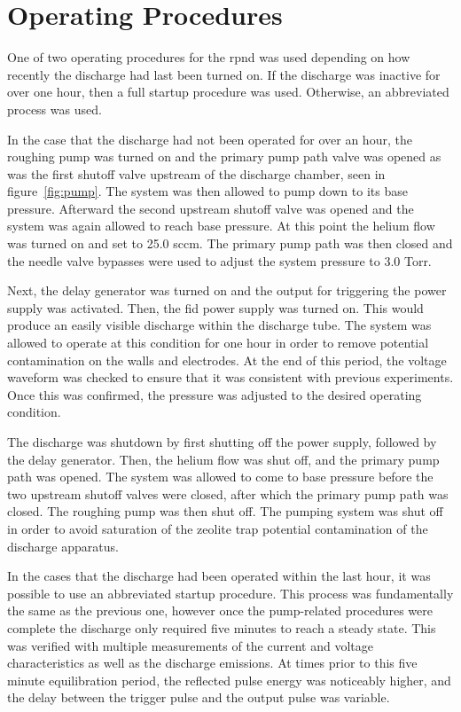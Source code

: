 \section{Operating Procedures}

One of two operating procedures for the \acs{rpnd} was used depending on how
recently the discharge had last been turned on. If the discharge was inactive
for over one hour, then a full startup procedure was used. Otherwise, an abbreviated
process was used.

In the case that the discharge had not been operated for over an hour, the
roughing pump was turned on and the primary pump path valve was opened as was
the first shutoff valve upstream of the discharge chamber, seen in
figure~\ref{fig:pump}. The system was then allowed to pump down to its base
pressure. Afterward the second upstream shutoff valve was opened and the system
was again allowed to reach base pressure. At this point the helium flow was
turned on and set to 25.0 sccm. The primary pump path was then closed and the
needle valve bypasses were used to adjust the system pressure to 3.0 Torr.

Next, the delay generator was turned on and the output for triggering the power
supply was activated. Then, the \acs{fid} power supply was turned on. This would
produce an easily visible discharge within the discharge tube. The system was
allowed to operate at this condition for one hour in order to remove potential
contamination on the walls and electrodes. At the end of this period, the
voltage waveform was checked to ensure that it was consistent with previous
experiments. Once this was confirmed, the pressure was adjusted to the desired
operating condition.

The discharge was shutdown by first shutting off the power supply, followed by
the delay generator. Then, the helium flow was shut off, and the primary pump
path was opened. The system was allowed to come to base pressure before the two
upstream shutoff valves were closed, after which the primary pump path was
closed. The roughing pump was then shut off. The pumping system was shut off in
order to avoid saturation of the zeolite trap potential contamination of the
discharge apparatus.

In the cases that the discharge had been operated within the last hour, it was
possible to use an abbreviated startup procedure. This process was fundamentally
the same as the previous one, however once the pump-related procedures were
complete the discharge only required five minutes to reach a steady state. This
was verified with multiple measurements of the current and voltage
characteristics as well as the discharge emissions. At times prior to this five
minute equilibration period, the reflected pulse energy was noticeably higher,
and the delay between the trigger pulse and the output pulse was variable.

